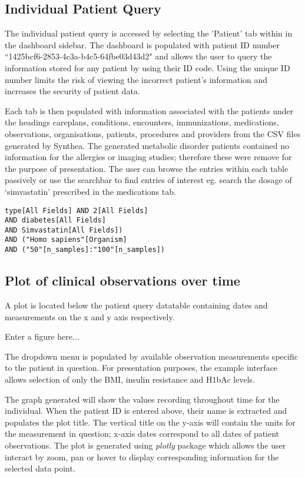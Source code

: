 \documentclass{bioinfo}
\begin{document}
\subsection{Individual Patient Query}

The individual patient query is accessed by selecting the 'Patient' tab within in the dashboard sidebar. The dashboard is populated with patient ID number ``1425bcf6-2853-4c3a-b4c5-64fbe03d43d2" and allows the user to query the information stored for any patient by using their ID code. Using the unique ID number limits the risk of viewing the incorrect patient's information and increases the security of patient data. 

Each tab is then populated with information associated with the patient\textquotesingles s under the headings careplans, conditions, encounters, immunizations, medications, observations, organisations, patients, procedures and providers from the CSV files generated by  Synthea. The generated metabolic disorder patients contained no information for the allergies or imaging studies; therefore these were remove for the purpose of presentation. The user can browse the entries within each table passively or use the searchbar to find entries of interest eg. search the dosage of `simvastatin' prescribed in the medications tab. 

\begin{verbatim}
type[All Fields] AND 2[All Fields] 
AND diabetes[All Fields] 
AND Simvastatin[All Fields])
AND ("Homo sapiens"[Organism] 
AND ("50"[n_samples]:"100"[n_samples])

\end{verbatim}

\subsection{Plot of clinical observations over time}
A plot is located below the patient query datatable containing dates and measurements on the x and y axis respectively. 
 
Enter a figure here... 

The dropdown menu is populated by available observation measurements specific to the patient in question. For presentation purposes, the example interface allows selection of only the BMI, insulin resistance and H1bAc levels.

The graph generated will show the values recording throughout time for the individual. When the patient ID is entered above, their name is extracted and populates the plot title. The vertical title on the y-axis will contain the units for the measurement in question; x-axis dates correspond to all dates of patient observations. The plot is generated using \textit{plotly} package which allows the user interact by zoom, pan or hover to display corresponding information for the selected data point.
\end{document}
